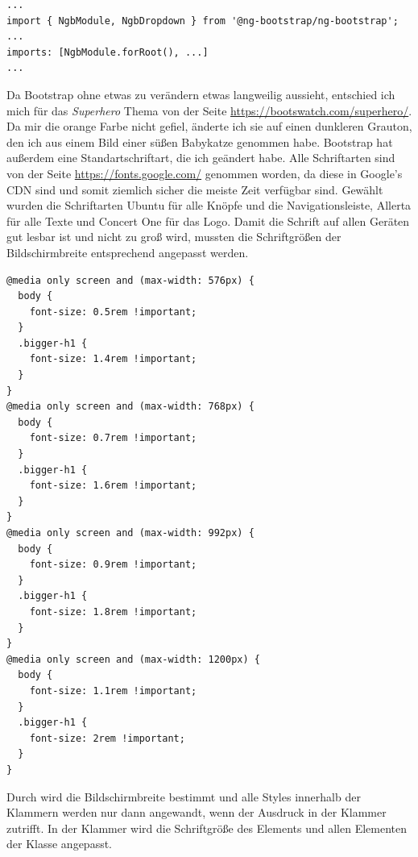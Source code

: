\begin{lstlisting}[caption=app.module (Auszug) Importieren von ng-bootstrap,label=import-ng-bootstrap,style=TS]
...
import { NgbModule, NgbDropdown } from '@ng-bootstrap/ng-bootstrap';
...
imports: [NgbModule.forRoot(), ...]
...
\end{lstlisting}

Da Bootstrap ohne etwas zu verändern etwas langweilig aussieht, entschied ich mich für das \textit{Superhero} Thema von der Seite \url{https://bootswatch.com/superhero/}. Da mir die orange Farbe nicht gefiel, änderte ich sie auf einen dunkleren Grauton, den ich aus einem Bild einer süßen Babykatze genommen habe. Bootstrap hat außerdem eine Standartschriftart, die ich geändert habe. Alle Schriftarten sind von der Seite \url{https://fonts.google.com/} genommen worden, da diese in Google's \ac{CDN} sind und somit ziemlich sicher die meiste Zeit verfügbar sind. Gewählt wurden die Schriftarten Ubuntu für alle Knöpfe und die Navigationsleiste, Allerta für alle Texte und Concert One für das Logo. Damit die Schrift auf allen Geräten gut lesbar ist und nicht zu groß wird, mussten die Schriftgrößen der Bildschirmbreite entsprechend angepasst werden.

\begin{lstlisting}[caption=Schriftgrößen entsprechend der Bildschirmbreite,label=css-font-sizes,style=css]
@media only screen and (max-width: 576px) {
  body {
    font-size: 0.5rem !important;
  }
  .bigger-h1 {
    font-size: 1.4rem !important;
  }
}
@media only screen and (max-width: 768px) {
  body {
    font-size: 0.7rem !important;
  }
  .bigger-h1 {
    font-size: 1.6rem !important;
  }
}
@media only screen and (max-width: 992px) {
  body {
    font-size: 0.9rem !important;
  }
  .bigger-h1 {
    font-size: 1.8rem !important;
  }
}
@media only screen and (max-width: 1200px) {
  body {
    font-size: 1.1rem !important;
  }
  .bigger-h1 {
    font-size: 2rem !important;
  }
}
\end{lstlisting}

Durch  wird die Bildschirmbreite bestimmt und alle Styles innerhalb der Klammern werden nur dann angewandt, wenn der Ausdruck in der Klammer zutrifft. In der Klammer wird die Schriftgröße des  Elements und allen Elementen der Klasse  angepasst.

